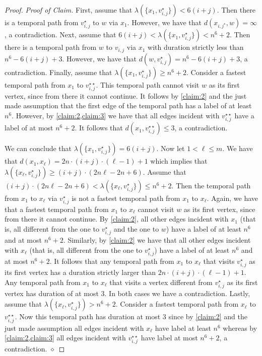 \documentclass[11pt,a4paper]{article}
\theoremstyle{remark}
\theoremstyle{definition}
\newenvironment{claimproof}{\noindent\emph{Proof of Claim.}}{\hfill$\diamond$

}
\begin{document}
\begin{proof}
\begin{claimproof}
    First, assume that $\lambda(\{x_1,v_{i,j}^{\star}\})<6(i+j)$. Then there is a temporal path from $v_{i,j}^\star$ to $w$ via $x_1$. However, we have that $d(x_{i,j^\star},w)=\infty$, a contradiction.
    Next, assume that $6(i+j)<\lambda(\{x_1,v_{i,j}^{\star}\})<n^6+2$. Then there is a temporal path from $w$ to $v_{i,j}$ via $x_1$ with duration strictly less than $n^6-6(i+j)+3$. However, we have that $d(w,v_{i,j}^\star)=n^6-6(i+j)+3$, a contradiction.
    Finally, assume that $\lambda(\{x_1,v_{i,j}^{\star}\})\ge n^6+2$. Consider a fastest temporal path from $x_1$ to $v_{i,j}^{\star\star}$. This temporal path cannot visit $w$ as its first vertex, since from there it cannot continue. It follows by \cref{claim:2} and the just made assumption that the first edge of the temporal path has a label of at least $n^6$. However, by \cref{claim:2,claim:3} we have that all edges incident with $v_{i,j}^{\star\star}$ have a label of at most $n^6+2$. It follows that $d(x_1,v_{i,j}^{\star\star})\le 3$, a contradiction.

    We can conclude that $\lambda(\{x_1,v_{i,j}^{\star}\})=6(i+j)$. Now let $1<\ell\le m$. We have that $d(x_1,x_\ell)=2n\cdot (i+j)\cdot(\ell-1)+1$ which implies that $\lambda(\{x_\ell,v_{i,j}^{\star}\})\ge (i+j)\cdot (2n\ell -2n+6)$. Assume that $(i+j)\cdot (2n\ell -2n+6) <\lambda(\{x_\ell,v_{i,j}^{\star}\})\le n^6+2$. Then the temporal path from $x_1$ to $x_\ell$ via $v_{i,j}^\star$ is not a fastest temporal path from $x_1$ to $x_\ell$. Again, we have that a fastest temporal path from $x_1$ to $x_\ell$ cannot visit $w$ as its first vertex, since from there it cannot continue. By \cref{claim:2}, all other edges incident with $x_1$ (that is, all different from the one to $v_{i,j}^\star$ and the one to $w$) have a label of at least $n^6$ and at most $n^6+2$. Similarly, by \cref{claim:2} we have that all other edges incident with $x_\ell$ (that is, all different from the one to $v_{i,j}^\star$) have a label of at least $n^6$ and at most $n^6+2$. It follows that any temporal path from $x_1$ to $x_\ell$ that visits $v_{i,j}^\star$ as its first vertex has a duration strictly larger than $2n\cdot (i+j)\cdot(\ell-1)+1$. Any temporal path from $x_1$ to $x_\ell$ that visits a vertex different from $v_{i,j}^\star$ as its first vertex has duration of at most $3$. In both cases we have a contradiction. 
    Lastly, assume that $\lambda(\{x_\ell,v_{i,j}^{\star}\})> n^6+2$. Consider a fastest temporal path from $x_\ell$ to $v_{i,j}^{\star\star}$. Now this temporal path has duration at most 3 since by \cref{claim:2} and the just made assumption all edges incident with $x_\ell$ have label at least $n^6$ whereas by \cref{claim:2,claim:3} all edges incident with $v_{i,j}^{\star\star}$ have label at most $n^6+2$, a contradiction. 
\end{claimproof}


\end{proof}
\end{document}
